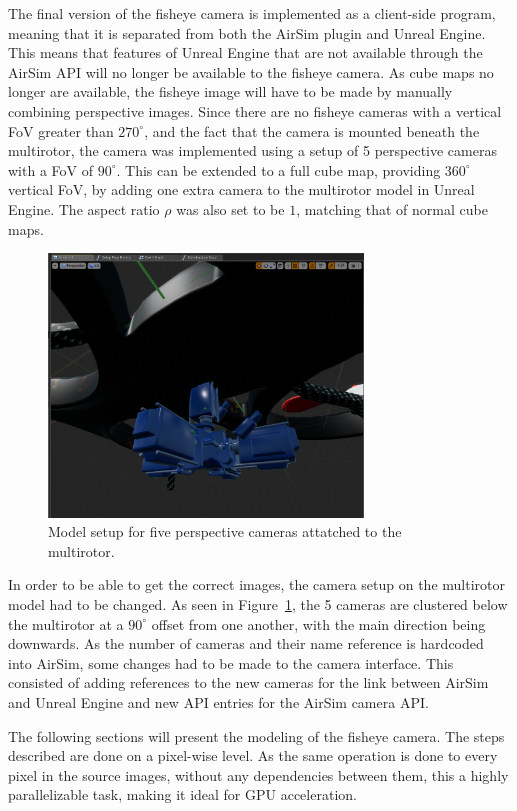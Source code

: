 The final version of the fisheye camera is implemented as a client-side program, meaning that it is separated from both the AirSim plugin and Unreal Engine. This means that features of Unreal Engine that are not available through the AirSim API will no longer be available to the fisheye camera. As cube maps no longer are available, the fisheye image will have to be made by manually combining perspective images. Since there are no fisheye cameras with a vertical FoV greater than $270^\circ$, and the fact that the camera is mounted beneath the multirotor, the camera was implemented using a setup of 5 perspective cameras with a FoV of $90^\circ$. This can be extended to a full cube map, providing $360^\circ$ vertical FoV, by adding one extra camera to the multirotor model in Unreal Engine. The aspect ratio $\rho$ was also set to be $1$, matching that of normal cube maps.

\begin{figure}[!htb]
    \centering
    \includegraphics[height=7cm]{rapport/fig/Simulator/camera_setup.png}
    \caption{Model setup for five perspective cameras attatched to the multirotor.}
    \label{fig:new_Blueprint_multirotor}
\end{figure}
In order to be able to get the correct images, the camera setup on the multirotor model had to be changed. As seen in Figure~\ref{fig:new_Blueprint_multirotor}, the 5 cameras are clustered below the multirotor at a $90^\circ$ offset from one another, with the main direction being downwards. As the number of cameras and their name reference is hardcoded into AirSim, some changes had to be made to the camera interface. This consisted of adding references to the new cameras for the link between AirSim and Unreal Engine and new API entries for the AirSim camera API.



The following sections will present the modeling of the fisheye camera. The steps described are done on a pixel-wise level. As the same operation is done to every pixel in the source images, without any dependencies between them, this a highly parallelizable task, making it ideal for GPU acceleration.

